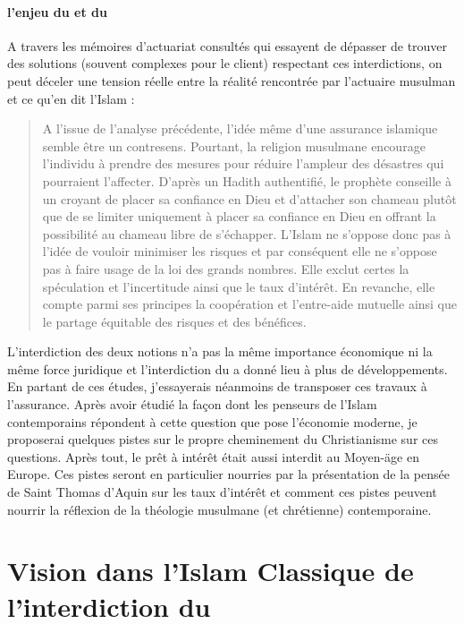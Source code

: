 \paragraph{l'enjeu du \riba et du \gharar}
A travers les mémoires d'actuariat consultés qui essayent de dépasser de trouver des solutions (souvent complexes pour le client) respectant ces interdictions, on peut déceler une tension réelle entre la réalité rencontrée par l'actuaire musulman et ce qu'en dit l'Islam : 
\begin{quote}
     
A l'issue de l'analyse précédente, l'idée même d'une assurance islamique semble être un contresens. Pourtant, la religion musulmane encourage l'individu à prendre des mesures pour réduire l'ampleur des désastres qui pourraient l'affecter. D'après un Hadith authentifié, le prophète conseille à un croyant de placer sa confiance en Dieu et d'attacher son chameau plutôt que de se limiter uniquement à placer sa confiance en Dieu en offrant la possibilité au chameau libre de s'échapper. L'Islam ne s'oppose donc pas à l'idée de vouloir minimiser les risques et par conséquent elle ne s'oppose pas à faire usage de la loi des grands nombres. Elle exclut certes la spéculation et l'incertitude ainsi que le taux d'intérêt. En revanche, elle compte parmi ses principes la coopération et l'entre-aide mutuelle ainsi que le partage équitable des risques et des bénéfices.
\end{quote}




L'interdiction des deux notions n'a pas la même importance économique ni la même force juridique et l'interdiction du {\riba} a donné lieu à plus de développements. En partant de ces études, j'essayerais néanmoins de transposer ces travaux à l'assurance.
Après avoir étudié la façon dont les penseurs de l'Islam contemporains répondent à cette question que pose l'économie moderne, je proposerai quelques pistes sur le propre cheminement du Christianisme sur ces questions. Après tout, le prêt à intérêt était aussi interdit au Moyen-äge en Europe. Ces pistes seront en particulier nourries par la présentation de la pensée de Saint Thomas d'Aquin sur les taux d'intérêt et comment ces pistes peuvent nourrir la réflexion de la théologie musulmane (et chrétienne) contemporaine. 
 

\section{Vision dans l'Islam Classique de l'interdiction du \riba}

